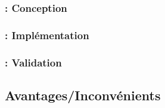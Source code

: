 \begin{frame}
\frametitle{\insertsubsection : Conception}

\end{frame}

\begin{frame}
\frametitle{\insertsubsection : Implémentation}

\end{frame}

\begin{frame}
\frametitle{\insertsubsection : Validation}

\end{frame}

\subsection{Avantages/Inconvénients}
\begin{frame}
\frametitle{\insertsubsection}
\end{frame}
